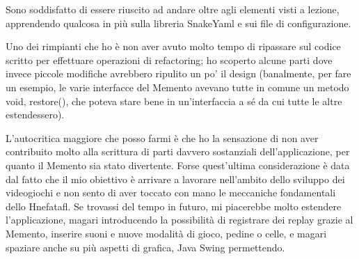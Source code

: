 \documentclass[a4paper,12pt]{report}
\begin{document}
Sono soddisfatto di essere riuscito ad andare oltre agli elementi visti a lezione, apprendendo qualcosa in più sulla libreria SnakeYaml e sui file di configurazione. 

Uno dei rimpianti che ho è non aver avuto molto tempo di ripassare sul codice scritto per effettuare operazioni di refactoring; ho scoperto alcune parti dove invece piccole modifiche avrebbero ripulito un po' il design (banalmente, per fare un esempio, le varie interfacce del Memento avevano tutte in comune un metodo void, restore(), che poteva stare bene in un'interfaccia a sé da cui tutte le altre estendessero). 

L'autocritica maggiore che posso farmi è che ho la sensazione di non aver contribuito molto alla scrittura di parti davvero sostanziali dell'applicazione, per quanto il Memento sia stato divertente. Forse quest'ultima considerazione è data dal fatto che il mio obiettivo è arrivare a lavorare nell'ambito dello sviluppo dei videogiochi e non sento di aver toccato con mano le meccaniche fondamentali dello Hnefatafl. Se trovassi del tempo in futuro, mi piacerebbe molto estendere l'applicazione, magari introducendo la possibilità di registrare dei replay grazie al Memento, inserire suoni e nuove modalità di gioco, pedine o celle, e magari spaziare anche su più aspetti di grafica, Java Swing permettendo.
\end{document}
